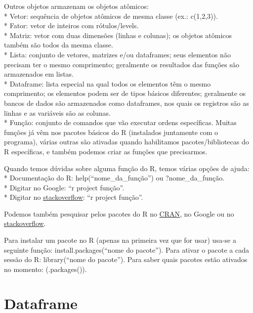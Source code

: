 \documentclass[
  letterpaper,
  DIV=11,
  numbers=noendperiod]{scrreprt}
\begin{document}
Outros objetos armazenam os objetos atômicos:\\
* Vetor: sequência de objetos atômicos de mesma classe (ex.:
c(1,2,3)).\\
* Fator: vetor de inteiros com rótulos/levels.\\
* Matriz: vetor com duas dimensões (linhas e colunas); os objetos
atômicos também são todos da mesma classe.\\
* Lista: conjunto de vetores, matrizes e/ou dataframes; seus elementos
não precisam ter o mesmo comprimento; geralmente os resultados das
funções são armazenados em listas.\\
* Dataframe: lista especial na qual todos os elementos têm o mesmo
comprimento; os elementos podem ser de tipos básicos diferentes;
geralmente os bancos de dados são armazenados como dataframes, nos quais
os registros são as linhas e as variáveis são as colunas.\\
* Função: conjunto de comandos que vão executar ordens específicas.
Muitas funções já vêm nos pacotes básicos do R (instalados juntamente
com o programa), várias outras são ativadas quando habilitamos
pacotes/bibliotecas do R específicas, e também podemos criar as funções
que precisarmos.

Quando temos dúvidas sobre alguma função do R, temos várias opções de
ajuda:\\
* Documentação do R: help(``nome\_da\_função'') ou ?nome\_da\_função.\\
* Digitar no Google: ``r project função''.\\
* Digitar no \href{https://stackoverflow.com/}{stackoverflow}: ``r
project função''.

Podemos também pesquisar pelos pacotes do R no
\href{https://cran.r-project.org/}{CRAN}, no Google ou no
\href{https://stackoverflow.com/}{stackoverflow}.

Para instalar um pacote no R (apenas na primeira vez que for usar)
usa-se a seguinte função: install.packages(``nome do pacote''). Para
ativar o pacote a cada sessão do R: library(``nome do pacote''). Para
saber quais pacotes estão ativados no momento: (.packages()).


\chapter{Dataframe}\label{dataframe-1}
\end{document}
